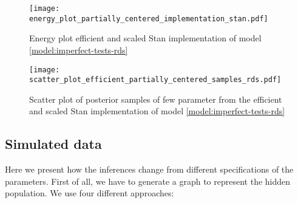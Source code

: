 \begin{figure}[htb]
  \centering
  \caption{\label{fig:energy_plot_partially_centered_implementation_stan}Energy plot
  efficient and scaled Stan implementation of model \eqref{model:imperfect-tests-rds}}
  \texttt{[image: energy\_plot\_partially\_centered\_implementation\_stan.pdf]}
\end{figure}

\begin{figure}[htb]
  \centering
  \caption{\label{fig:scatter_plot_efficient_partially_centered_samples_rds}Scatter plot 
  of posterior samples of few parameter from the efficient and scaled Stan implementation of model
  \eqref{model:imperfect-tests-rds}}
  \texttt{[image: scatter\_plot\_efficient\_partially\_centered\_samples\_rds.pdf]}
\end{figure}

\subsection{Simulated data}
\label{sec:simulated-data-rds-imperfect-tests}

Here we present how the inferences change from different specifications of the
parameters. First of all, we have to generate a graph to represent 
the hidden population. We use four different approaches:


